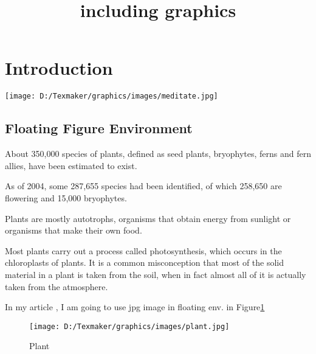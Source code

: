 \documentclass{article}
\begin{document}
\title {including graphics}




\section{Introduction}
\texttt{[image: D:/Texmaker/graphics/images/meditate.jpg]}






\subsection{Floating Figure Environment}


About 350,000 species of plants, defined as seed plants, bryophytes, ferns and fern allies, have been estimated to exist.

As of 2004, some 287,655 species had been identified, of which 258,650 are flowering and 15,000 bryophytes.

Plants are mostly autotrophs, organisms that obtain energy from sunlight or organisms that make their own food.

Most plants carry out a process called photosynthesis, which occurs in the chloroplasts of plants.
It is a common misconception that most of the solid material in a plant is taken from the soil, when in fact almost all of it is actually taken from the atmosphere.

In my article , I am going to use jpg image in floating env. in Figure\ref{fig:plant}


\begin{figure}
\begin{center}
\texttt{[image: D:/Texmaker/graphics/images/plant.jpg]}
\caption{Plant}
\label{fig:plant}
\end{center}
\end{figure}
\end{document}

